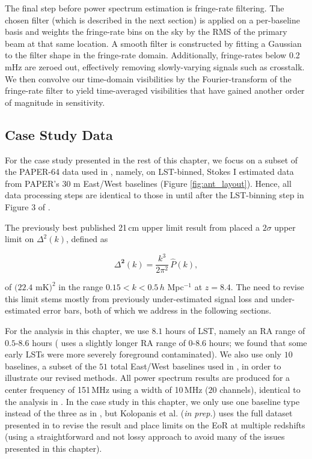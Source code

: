 The final step before power spectrum estimation is fringe-rate filtering. The chosen filter (which is described in the next section) is applied on a per-baseline basis and weights the fringe-rate bins on the sky by the RMS of the primary beam at that same location. A smooth filter is constructed by fitting a Gaussian to the filter shape in the fringe-rate domain. Additionally, fringe-rates below 0.2\,mHz are zeroed out, effectively removing slowly-varying signals such as crosstalk. We then convolve our time-domain visibilities by the Fourier-transform of the fringe-rate filter to yield time-averaged visibilities that have gained another order of magnitude in sensitivity.

\subsection{Case Study Data}

For the case study presented in the rest of this chapter, we 
focus on a subset of the PAPER-64 data used in , namely, on LST-binned, Stokes I estimated data \citep{moore_et_al2013} from PAPER's $30$ m East/West baselines (Figure 
\ref{fig:ant_layout}). Hence, all data processing steps are identical to those in  until after the LST-binning step in Figure 3 of .

The previously best published 21\,cm upper limit result from  placed a $2\sigma$ upper limit 
on $\Delta^{2}(k)$, defined as

\begin{equation}
\Delta^{\textbf{2}}(k) = \frac{k^{3}}{2\pi^{2}}\,\hat{P}(k),
\end{equation}

\noindent of $(22.4$ mK$)^{2}$ in the range $0.15 < k < 0.5$\,$h$ Mpc$^{-1}$ at $z = 8.4$. The need to revise this limit stems mostly from previously under-estimated signal loss and under-estimated error bars, both of which we 
address in the following sections. 

For the analysis in this chapter, we use $8.1$ hours of LST, namely an RA range of $0.5$-$8.6$ hours ( uses a slightly longer RA 
range of $0$-$8.6$ hours; we found that some early LSTs were more severely foreground contaminated). We also use only $10$ baselines, a subset of the $51$ total East/West baselines used in , in order to illustrate our revised methods. All power spectrum results are produced for a center frequency of 151\,MHz using a width of 10\,MHz ($20$ channels), identical to the analysis in . In the case study in this chapter, we only use one baseline type instead of the three as in 
, but Kolopanis et al. (\textit{in prep.}) uses the full dataset presented in  to revise the result and place limits on the EoR at multiple redshifts (using a straightforward and not lossy approach to avoid many of the issues presented in this chapter).

